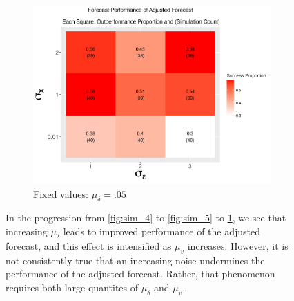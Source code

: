 \documentclass{uiucthesis2021}
\theoremstyle{definition}
\begin{document}
\begin{figure}[!h]
      \begin{subfigure}{.44\linewidth} 
        \centering
          \includegraphics[scale=.42]{simulation_plots/Nov27_160346_2024_sigmax_sigmaepsilon.png}
          \caption{Fixed values: $\mu_{\delta}=.05$}\label{fig:sim_6}
      \end{subfigure}
      
          \caption{In the progression from \ref{fig:sim_4} to \ref{fig:sim_5} to \ref{fig:sim_6}, we see that increasing $\mu_{\delta}$ leads to improved performance of the adjusted forecast, and this effect is intensified as $\mu_{v}$ increases.  However, it is not consistently true that an increasing noise undermines the performance of the adjusted forecast.  Rather, that phenomenon requires both large quantites of $\mu_{\delta}$ and $\mu_{v}$.}
          \label{fig:set_of_three_two}
        \end{figure}
    
\end{document}
